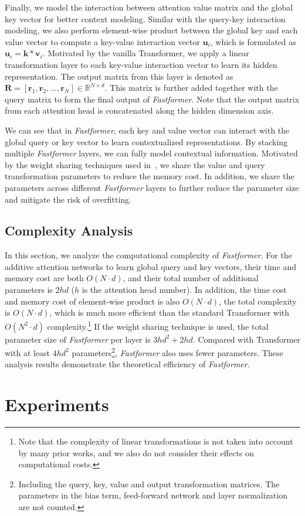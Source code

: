 \documentclass[11pt,a4paper]{article}
\begin{document}
Finally, we model the interaction between attention value matrix and the global key vector for better context modeling.
Similar with the query-key interaction modeling, we also perform element-wise product between the global key and each value vector to compute a key-value interaction vector $\mathbf{u}_i$, which is formulated as $\mathbf{u}_i=\mathbf{k}*\mathbf{v}_i$.
Motivated by the vanilla Transformer, we apply a linear transformation layer to each key-value interaction vector to learn its hidden representation.
The output matrix from this layer is denoted as $\mathbf{R}=[\mathbf{r}_1, \mathbf{r}_2, ..., \mathbf{r}_N]\in \mathbb{R}^{N\times d}$.
This matrix is further added together with the query matrix to form the final output of \textit{Fastformer}.
Note that the output matrix from each attention head is concatenated along the hidden dimension axis.



We can see that in \textit{Fastformer}, each key and value vector can interact with the global query or key vector to learn contextualized representations.
By stacking multiple \textit{Fastformer} layers, we can fully model contextual information.
Motivated by the weight sharing techniques used in~\cite{wang2020linformer}, we share the value and query transformation parameters to reduce the memory cost.
In addition, we share the parameters across different  \textit{Fastformer} layers to further reduce the parameter size and mitigate the risk of overfitting.



\subsection{Complexity Analysis}

In this section, we analyze the computational complexity of \textit{Fastformer}.
For the additive attention networks to learn global query and key vectors, their time and memory cost are both $O(N\cdot d)$, and their total number of additional parameters is $2hd$ ($h$ is the attention head number).
In addition, the time cost and memory cost of element-wise product is also $O(N\cdot d)$, the total complexity is $O(N\cdot d)$, which is much more efficient than the standard Transformer with $O(N^2 \cdot d)$ complexity.\footnote{Note that the complexity of linear transformations is not taken into account by many prior works, and we also do not consider their effects on computational costs.}
If the weight sharing technique is used, the total parameter size of \textit{Fastformer} per layer is $3hd^2+2hd$.
Compared with Transformer with at least $4hd^2$ parameters\footnote{Including the query, key, value and output transformation matrices. The parameters in the bias term, feed-forward network and layer normalization are not counted.}, \textit{Fastformer} also uses fewer parameters.
These analysis results demonstrate the theoretical efficiency of \textit{Fastformer}. \section{Experiments}\label{sec:Experiments}
\end{document}
